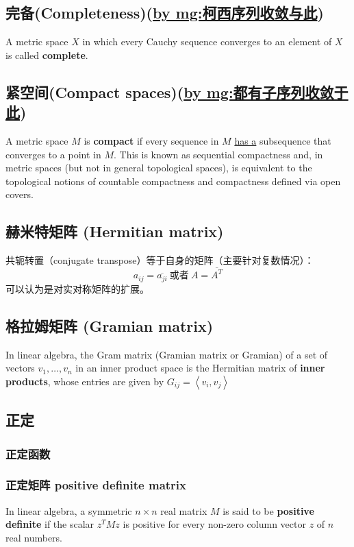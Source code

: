 \subsection{完备(Completeness)(\underline{by mg:柯西序列收敛与此})}
\cite{_cauchy_????}
A metric space $X$ in which every Cauchy sequence converges to an element of $X$ is called \textbf{complete}.

\subsection{紧空间(Compact spaces)(\underline{by mg:都有子序列收敛于此})}
\cite{_cauchy_????}
A metric space $M$ is \textbf{compact} if every sequence in $M$ \underline{has a} subsequence that converges to a point in $M$. This is known as sequential compactness and, in metric spaces (but not in general topological spaces), is equivalent to the topological notions of countable compactness and compactness defined via open covers.

\subsection{赫米特矩阵 (Hermitian matrix)}
共轭转置（conjugate transpose）等于自身的矩阵（主要针对复数情况）：
\[ a_{ij}= \overline{a_{ji}} \ \text{或者} \  A=\overline{A^T}\]
可以认为是对实对称矩阵的扩展。

\subsection{格拉姆矩阵 (Gramian matrix)}
In linear algebra, the Gram matrix (Gramian matrix or Gramian) of a set of vectors $v_1, \dots, v_n$ in an inner product space is the Hermitian matrix of \textbf{inner products}, whose entries are given by $G_{ij}=\left< v_i,v_j \right>$






\subsection{正定}
\subsubsection{正定函数 }

\subsubsection{正定矩阵 positive definite matrix} 
\cite{_positive-definite_????}
In linear algebra, a symmetric $n \times n$ real matrix $M$ is said to be \textbf{positive definite} if the scalar $z^T M z$ is positive for every non-zero column vector $z$ of $n$ real numbers.


